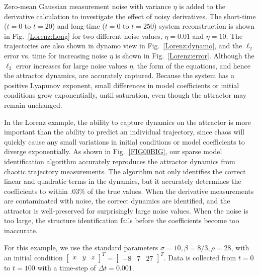 \documentclass[onecolumn,11pt]{article}
\begin{document}
Zero-mean Gaussian measurement noise with variance $\eta$ is added to the derivative calculation to investigate the effect of noisy derivatives.  The short-time ($t=0$ to $t=20$) and long-time ($t=0$ to $t=250$) system reconstruction is shown in Fig.~\ref{Lorenz:Long} for two different noise values, $\eta=0.01$ and $\eta=10$.  The trajectories are also shown in dynamo view in Fig.~\ref{Lorenz:dynamo}, and the $\ell_2$ error vs. time for increasing noise $\eta$ is shown in Fig.~\ref{Lorenz:error}.  Although the $\ell_2$ error increases for large noise values $\eta$, the form of the equations, and hence the attractor dynamics, are accurately captured.  Because the system has a positive Lyapunov exponent, small differences in model coefficients or initial conditions grow exponentially, until saturation, even though the attractor may remain unchanged.

In the Lorenz example, the ability to capture dynamics on the attractor is more important than the ability to predict an individual trajectory, since chaos will quickly cause any small variations in initial conditions or model coefficients to diverge exponentially.  
As shown in Fig.~\ref{FIG00BIG}, our sparse model identification algorithm accurately reproduces the attractor dynamics from chaotic trajectory measurements.  The algorithm not only identifies the correct linear and quadratic terms in the dynamics, but it accurately determines the coefficients to within $.03\%$ of the true values.  When the derivative measurements are contaminated with noise, the correct dynamics are identified, and the attractor is well-preserved for surprisingly large noise values.  When the noise is too large, the structure identification fails before the coefficients become too inaccurate.  
%
%


For this example, we use the standard parameters $\sigma=10, \beta=8/3, \rho = 28$, with an initial condition $\begin{bmatrix} x & y & z\end{bmatrix}^T = \begin{bmatrix} -8 & 7 & 27 \end{bmatrix}^T$.  Data is collected from $t=0$ to $t=100$ with a time-step of $\Delta t=0.001$.   
\end{document}
